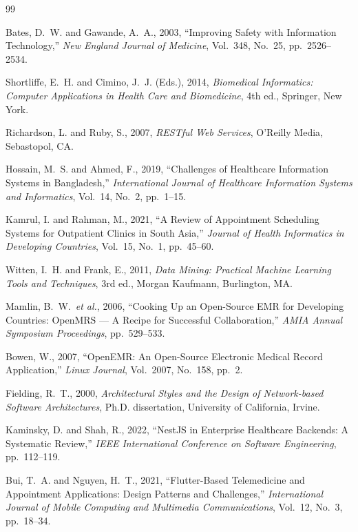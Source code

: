 \documentclass[12pt,a4paper]{report}
\begin{document}
\clearpage
\begingroup
\renewcommand{\bibname}{References}
\begin{thebibliography}{99}
\setlength{\itemsep}{6pt}
\setlength{\parsep}{0pt}

Bates, D.~W. and Gawande, A.~A., 2003, ``Improving Safety with Information Technology,''
\textit{New England Journal of Medicine}, Vol.~348, No.~25, pp.~2526--2534.

Shortliffe, E.~H. and Cimino, J.~J. (Eds.), 2014, \textit{Biomedical Informatics:
Computer Applications in Health Care and Biomedicine}, 4th ed., Springer, New York.

Richardson, L. and Ruby, S., 2007, \textit{RESTful Web Services}, O'Reilly Media,
Sebastopol, CA.

Hossain, M.~S. and Ahmed, F., 2019, ``Challenges of Healthcare Information Systems in
Bangladesh,'' \textit{International Journal of Healthcare Information Systems and
Informatics}, Vol.~14, No.~2, pp.~1--15.

Kamrul, I. and Rahman, M., 2021, ``A Review of Appointment Scheduling Systems for
Outpatient Clinics in South Asia,'' \textit{Journal of Health Informatics in Developing
Countries}, Vol.~15, No.~1, pp.~45--60.

Witten, I.~H. and Frank, E., 2011, \textit{Data Mining: Practical Machine Learning
Tools and Techniques}, 3rd ed., Morgan Kaufmann, Burlington, MA.

Mamlin, B.~W.\ \textit{et al.}, 2006, ``Cooking Up an Open-Source EMR for Developing
Countries: OpenMRS --- A Recipe for Successful Collaboration,'' \textit{AMIA Annual
Symposium Proceedings}, pp.~529--533.

Bowen, W., 2007, ``OpenEMR: An Open-Source Electronic Medical Record Application,''
\textit{Linux Journal}, Vol.~2007, No.~158, pp.~2.

Fielding, R.~T., 2000, \textit{Architectural Styles and the Design of Network-based
Software Architectures}, Ph.D. dissertation, University of California, Irvine.

Kaminsky, D. and Shah, R., 2022, ``NestJS in Enterprise Healthcare Backends: A
Systematic Review,'' \textit{IEEE International Conference on Software Engineering},
pp.~112--119.

Bui, T.~A. and Nguyen, H.~T., 2021, ``Flutter-Based Telemedicine and Appointment
Applications: Design Patterns and Challenges,'' \textit{International Journal of Mobile
Computing and Multimedia Communications}, Vol.~12, No.~3, pp.~18--34.


\end{thebibliography}
\end{document}
